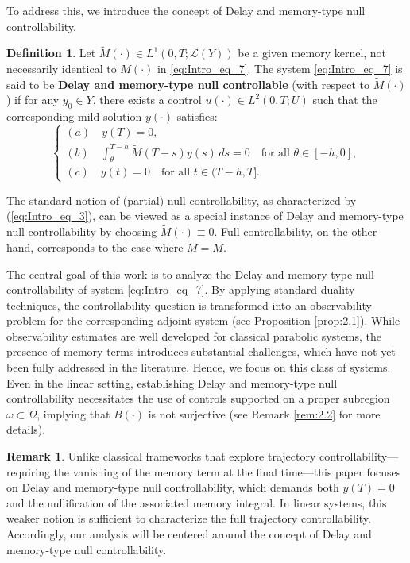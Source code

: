 \documentclass[12pt]{article}
\theoremstyle{plain}
\theoremstyle{definition}
\newtheorem{remark}{Remark}[section]
\newtheorem{definition}{Definition}[section]
\begin{document}
To address this, we introduce the concept of Delay and memory-type null controllability.
\begin{definition}\label{def:Def_memory_type of null control}
Let $\widetilde{M}(\cdot) \in L^1(0,T; \mathcal{L}(Y))$ be a given memory kernel, not necessarily identical to $M(\cdot)$ in \eqref{eq:Intro_eq_7}. The system \eqref{eq:Intro_eq_7} is said to be \textbf{Delay and memory-type null controllable} (with respect to $\widetilde{M}(\cdot)$) if for any $y_0 \in Y$, there exists a control $u(\cdot) \in L^2(0,T;U)$ such that the corresponding mild solution $y(\cdot)$ satisfies:
\begin{equation}\label{eq:Intro_eq_9}
\begin{cases}
   (a)\quad y(T) = 0, \\[6pt]
   (b)\quad \displaystyle\int_{\theta}^{T-h} \widetilde{M}(T - s)y(s)\,ds = 0 \quad \text{for all } \theta \in [-h, 0], \\[6pt]
    (c)\quad y(t) = 0 \quad \text{for all } t \in (T - h, T].
\end{cases}
\end{equation}


\end{definition}



The standard notion of (partial) null controllability, as characterized by (\ref{eq:Intro_eq_3}), can be viewed as a special instance of Delay and memory-type null controllability by choosing $\widetilde{M}(\cdot) \equiv 0$. Full controllability, on the other hand, corresponds to the case where $\widetilde{M} = M$.

The central goal of this work is to analyze the Delay and memory-type null controllability of system \eqref{eq:Intro_eq_7}. By applying standard duality techniques, the controllability question is transformed into an observability problem for the corresponding adjoint system (see Proposition \ref{prop:2.1}). While observability estimates are well developed for classical parabolic systems, the presence of memory terms introduces substantial challenges, which have not yet been fully addressed in the literature. Hence, we focus on this class of systems. Even in the linear setting, establishing Delay and memory-type null controllability necessitates the use of controls supported on a proper subregion $\omega \subset \Omega$, implying that $B(\cdot)$ is not surjective (see Remark \ref{rem:2.2} for more details).

\begin{remark}
\label{rem:1.2}
Unlike classical frameworks that explore trajectory controllability—requiring the vanishing of the memory term at the final time—this paper focuses on  Delay and memory-type null controllability, which demands both $y(T) = 0$ and the nullification of the associated memory integral. In linear systems, this weaker notion is sufficient to characterize the full trajectory controllability. Accordingly, our analysis will be centered around the concept of Delay and memory-type null controllability.
\end{remark}
\end{document}
